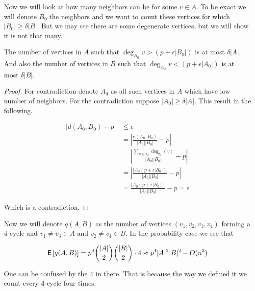 Now we will look at how many neighbors can be for some $v \in A$. To be exact we will denote $B_{0}$ the neighbors and we want to count these vertices for which $|B_{0}| \geq \delta |B|$. But we may see there are some degenerate vertices, but we will show it is not that many.

\begin{lemma}
	The number of vertices in $A$ such that $\deg_{B_{0}}v > (p + \epsilon |B_{0}|)$ is at most $\delta |A|$. And also the number of vertices in $B$ such that $\deg_{A_{0}}v < (p + \epsilon |A_{0}|)$ is at most $\delta |B|$.
\end{lemma}

\begin{proof}
	For contradiction denote $A_{0}$ as all such vertices in $A$ which have low number of neighbors. For the contradiction suppose $|A_{0}| \geq \delta |A|$. This result in the following.
	
	$$
	\begin{aligned}
		|d(A_{0}, B_{0}) - p| &\leq \epsilon \\
		 &= \left| \frac{e(A_{0},B_{0})}{|A_{0}| |B_{0}|} - p \right| \\
		 &= \left| \frac{\sum_{v \in A_{0}} \deg_{b_{0}}(v)}{|A_{0}| |B_{0}|} - p \right| \\
		 &= \left| \frac{|A_{0} (p+ \epsilon |B_{0}|)}{|A_{0}| |B_{0}|} - p \right| \\
		 &= \frac{|A_{0} (p+ \epsilon |B_{0}|)}{|A_{0}| |B_{0}|} - p = \epsilon
	\end{aligned}
	$$
	
	Which is a contradiction.
\end{proof}

Now we will denote $q(A,B)$ as the number of vertices $(v_1, v_2, v_3, v_4)$ forming a 4-cycle and $v_1 \neq v_3 \in A$ and $v_2 \neq v_4 \in B$. In the probability case we see that 

$$
\operatorname{\textsf{E}\,} [q(A,B)] = p^4 \binom{|A|}{2} \binom{|B|}{2} \cdot 4 \approx p^4 |A|^2 |B|^2 - O(n^3)
$$

One can be confused by the $4$ in there. That is because the way we defined it we count every 4-cycle four times.


